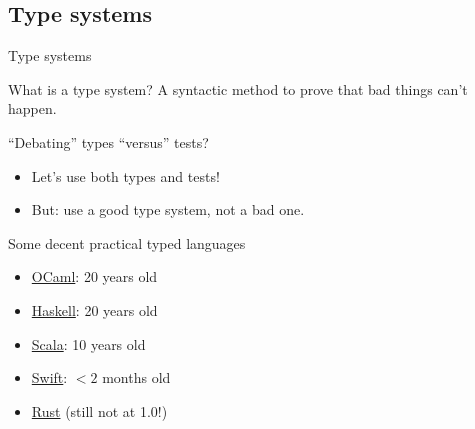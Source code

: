 \subsection{Type systems}

\begin{frame}{Type systems}
  \begin{block}{What is a type system?}
    A \alert{syntactic} method to \alert{prove} that bad things can't happen.
  \end{block}

  \begin{block}{``Debating'' types ``versus'' tests?}
    \begin{itemize}
    \item Let's use both types and tests!
    \item But: use a \alert{good} type system, not a bad one.
    \end{itemize}
  \end{block}

  \begin{block}{Some decent practical typed languages}
    \begin{itemize}
    \item \href{http://ocaml.org/}{OCaml}: 20 years old
    \item \href{http://www.haskell.org/}{Haskell}: 20 years old
    \item \href{http://www.scala-lang.org/}{Scala}: 10 years old
    \item \href{http://developer.apple.com/swift/}{Swift}: $<2$ months old
    \item \href{http://www.rust-lang.org/}{Rust} (still not at 1.0!)
    \end{itemize}
  \end{block}
\end{frame}

